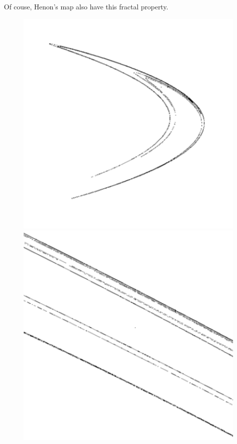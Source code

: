 \documentclass[12pt]{article}
\theoremstyle{plain}
\begin{document}
Of couse, Henon's map also have this fractal property.\\[5ex]
\begin{figure}[H]
\begin{minipage}[c][0.23\width]{
   0.23\textwidth}
   \centering
   \includegraphics[width=1\textwidth]{figure/section4/Henon-self-similar-00.png}
\end{minipage}
\begin{minipage}[c][0.23\width]{
   0.23\textwidth}
   \centering
   \includegraphics[width=1\textwidth]{figure/section4/Henon-self-similar-01.png}

\end{minipage}
\end{figure}
\end{document}
